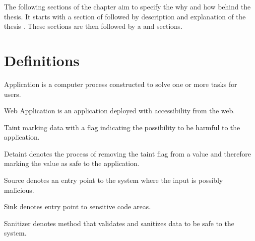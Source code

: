 The following sections of the chapter aim to specify the why and how behind the thesis. It starts with a section of \textit{} followed by \textit{} description and explanation of the thesis \textit{}. These sections are then followed by a \textit{} and \textit{} sections.



\section{Definitions}
\label{Definitions}

\begin{definition}{Application}
    is a computer process constructed to solve one or more tasks for users.
    \\
\end{definition}

\begin{definition}{Web Application}
    is an application deployed with accessibility from the web.
    \\
\end{definition}

\begin{definition}{Taint}
    marking data with a flag indicating the possibility to be harmful to the application.
    \\
\end{definition}

\begin{definition}{Detaint}
    denotes the process of removing the taint flag from a value and therefore marking the value as safe to the application.
    \\
\end{definition}

\begin{definition}{Source}
    denotes an entry point to the system where the input is possibly malicious.
    \\
\end{definition}

\begin{definition}{Sink}
    denotes entry point to sensitive code areas.
    \\
\end{definition}

\begin{definition}{Sanitizer}
    denotes method that validates and sanitizes data to be safe to the system.
    \\
\end{definition}

